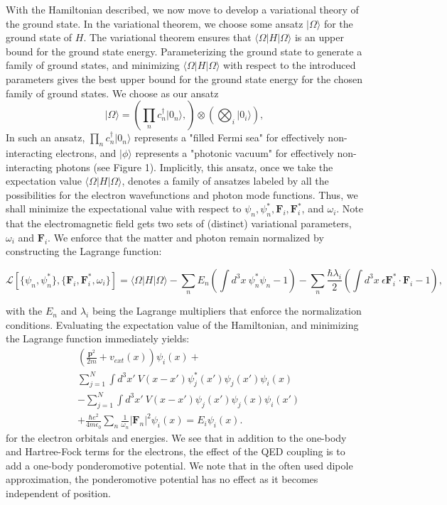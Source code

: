 \documentclass[aps,prl,twocolumn,
	groupedaddress,superscriptaddress,
	amsfonts,amssymb,amsmath,floatfix,
	citeautoscript]{revtex4-1}
\begin{document}
With the Hamiltonian described, we now move to develop a variational theory of the ground state. In the variational theorem, we choose some ansatz $|\Omega\rangle$ for the ground state of $H$. The variational theorem ensures that $\langle \Omega|H|\Omega\rangle$ is an upper bound for the ground state energy. Parameterizing the ground state to generate a family of ground states, and minimizing $\langle \Omega|H|\Omega\rangle$ with respect to the introduced parameters gives the best upper bound for the ground state energy for the chosen family of ground states.  We choose as our ansatz
\begin{equation}
|\Omega\rangle = \left( \prod\limits_n c_n^{\dagger}|0_n\rangle,\right) \otimes \left(\bigotimes_i|0_i\rangle\right),
\end{equation}
In such an ansatz, $\prod\limits_n c_n^{\dagger}|0_n\rangle$ represents a "filled Fermi sea" for effectively non-interacting electrons, and $|\phi\rangle$ represents a "photonic vacuum" for effectively non-interacting photons (see Figure 1). Implicitly, this ansatz, once we take the expectation value $\langle \Omega|H|\Omega\rangle$, denotes a family of ansatzes labeled by all the possibilities for the electron wavefunctions and photon mode functions. Thus, we shall minimize the expectational value with respect to $\psi_n, \psi_n^*, \mathbf{F}_i, \mathbf{F}_i^*$, and $\omega_i$. Note that the electromagnetic field gets two sets of (distinct) variational parameters, $\omega_i$ and $\mathbf{F}_i$. We enforce that the matter and photon remain normalized by constructing the Lagrange function:
\begin{widetext}
\begin{equation}
\mathcal{L}[\{ \psi_n,\psi_n^* \},\{ \mathbf{F}_i,\mathbf{F}_i^*,\omega_i \}] = \langle \Omega |H|\Omega\rangle - \sum_n E_n\left(\int d^3x ~\psi_n^*\psi_n - 1 \right) - \sum_n \frac{\hbar\lambda_i}{2}\left(\int d^3x ~\epsilon\mathbf{F}_i^*\cdot\mathbf{F}_i - 1 \right),
\end{equation}
\end{widetext}
with the $E_n$ and $\lambda_i$ being the Lagrange multipliers that enforce the normalization conditions. Evaluating the expectation value of the Hamiltonian, and minimizing the Lagrange function  immediately yields:
\begin{align}
&\left(\frac{\mathbf{p}^2}{2m}+v_{ext}(x) \right)\psi_i(x) + \nonumber \\ &\sum\limits_{j=1}^N \int d^3x' ~ V(x-x')\psi^*_j(x')\psi_j(x')\psi_i(x) \nonumber \\ & - \sum\limits_{j=1}^N \int d^3x' ~ V(x-x')\psi_j(x')\psi_j(x)\psi_i(x')  \nonumber \\ &+ \frac{\hbar e^2}{4m\epsilon_0}\sum_n \frac{1}{\omega_n}|\mathbf{F}_n|^2\psi_i(x)   = E_i\psi_i(x).
\end{align}
for the electron orbitals and energies. We see that in addition to the one-body and Hartree-Fock terms for the electrons, the effect of the QED coupling is to add a one-body ponderomotive potential. We note that in the often used dipole approximation, the ponderomotive potential has no effect as it becomes independent of position.
\end{document}
